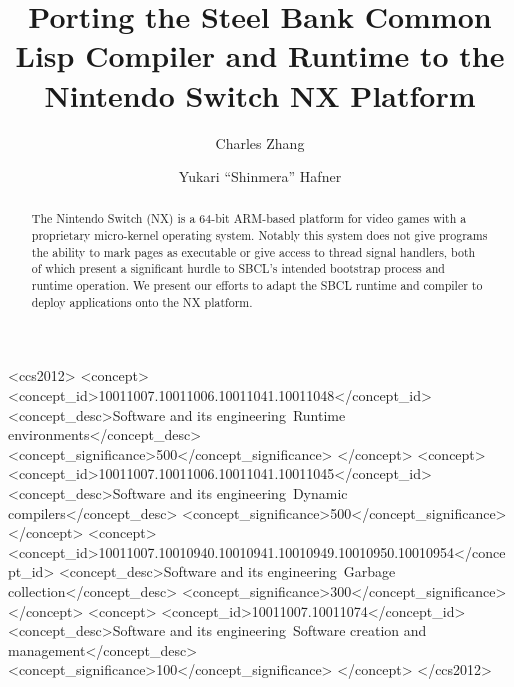 \documentclass[format=sigconf]{acmart}
\begin{document}
\title{Porting the Steel Bank Common Lisp Compiler and Runtime to the Nintendo Switch NX Platform}

\author{Charles Zhang}
\author{Yukari ``Shinmera'' Hafner}

\begin{CCSXML}
<ccs2012>
   <concept>
       <concept_id>10011007.10011006.10011041.10011048</concept_id>
       <concept_desc>Software and its engineering~Runtime environments</concept_desc>
       <concept_significance>500</concept_significance>
       </concept>
   <concept>
       <concept_id>10011007.10011006.10011041.10011045</concept_id>
       <concept_desc>Software and its engineering~Dynamic compilers</concept_desc>
       <concept_significance>500</concept_significance>
       </concept>
   <concept>
       <concept_id>10011007.10010940.10010941.10010949.10010950.10010954</concept_id>
       <concept_desc>Software and its engineering~Garbage collection</concept_desc>
       <concept_significance>300</concept_significance>
       </concept>
   <concept>
       <concept_id>10011007.10011074</concept_id>
       <concept_desc>Software and its engineering~Software creation and management</concept_desc>
       <concept_significance>100</concept_significance>
       </concept>
 </ccs2012>
\end{CCSXML}


\begin{abstract}
  The Nintendo Switch (NX) is a 64-bit ARM-based platform for video games with a proprietary micro-kernel operating system. Notably this system does not give programs the ability to mark pages as executable or give access to thread signal handlers, both of which present a significant hurdle to SBCL's intended bootstrap process and runtime operation. We present our efforts to adapt the SBCL runtime and compiler to deploy applications onto the NX platform.
\end{abstract}


\maketitle
\end{document}
